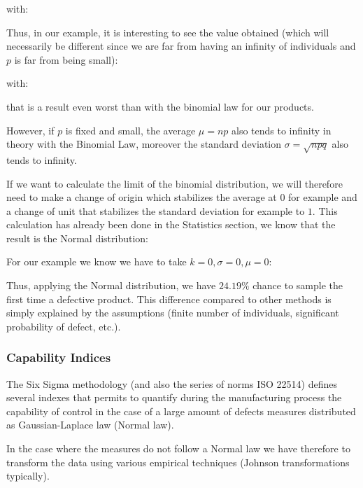 with:
	
Thus, in our example, it is interesting to see the value obtained (which will necessarily be different since we are far from having an infinity of individuals and $p$ is far from being small):
	
with:
	
that is a result even worst than with the binomial law for our products.

However, if $p$ is fixed and small, the average $\mu=np$ also tends to infinity in theory with the Binomial Law, moreover the standard deviation $\sigma=\sqrt{npq}$ also tends to infinity.

If we want to calculate the limit of the binomial distribution, we will therefore need to make a change of origin which stabilizes the average at $0$ for example and a change of unit that stabilizes the standard deviation for example to $1$. This calculation has already been done in the Statistics section, we know that the result is the Normal distribution:
	
For our example we know we have to take $k=0,\sigma=0,\mu=0$:
	
Thus, applying the Normal distribution, we have $24.19\%$ chance to sample the first time a defective product. This difference compared to other methods is simply explained by the assumptions (finite number of individuals, significant probability of defect, etc.).

	\subsubsection{Capability Indices}\label{capability indices}

The Six Sigma methodology (and also the series of norms ISO 22514) defines several indexes that permits to quantify during the manufacturing process the capability of control in the case of a large amount of defects measures distributed as Gaussian-Laplace law (Normal law).

In the case where the measures do not follow a Normal law we have therefore to transform the data using various empirical techniques (Johnson transformations typically).

